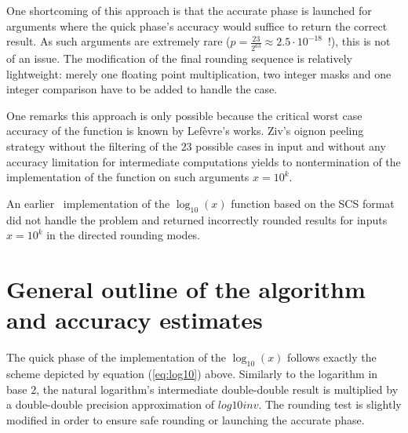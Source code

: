 One shortcoming of this approach is that the
accurate phase is launched for arguments where the quick phase's
accuracy would suffice to return the correct result. As
such arguments are extremely rare ($p = \frac{23}{2^{63}} \approx 2.5
\cdot 10^{-18}$~!), this is not of an issue. The modification of the
final rounding sequence is relatively lightweight: merely one floating
point multiplication, two integer masks and one integer comparison
have to be added to handle the case.

One remarks this approach is only possible because the critical worst
case accuracy of the function is known by Lef{\`e}vre's works. Ziv's oignon peeling
strategy without the filtering of the
$23$ possible cases in input and without any accuracy limitation for
intermediate computations yields to nontermination of the
implementation of the function on such arguments $x = 10^k$.

An earlier \crlibm\ implementation of the $\log_{10}\left(x\right)$
function based on the SCS format did not handle the problem and
returned incorrectly rounded results for inputs $x = 10^k$ in the
directed rounding modes.


\section{General outline of the algorithm and accuracy estimates}\label{subsec:outlinelog10}
%

The quick phase of the implementation of the $\log_{10}\left( x
\right)$ follows exactly the scheme depicted by equation
(\ref{eq:log10}) above. Similarly to the logarithm in base
$2$, the natural logarithm's intermediate double-double result is
multiplied by a double-double precision approximation of
$\mathit{log10inv}$. The rounding test is slightly modified in order
to ensure safe rounding or launching the accurate phase.

